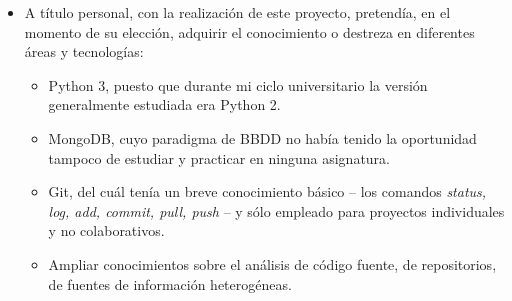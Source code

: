 \begin{itemize}
\item A título personal, con la realización de este proyecto, pretendía, en el momento de su elección, adquirir el conocimiento o destreza en diferentes áreas y tecnologías:

\begin{itemize}
\item Python 3, puesto que durante mi ciclo universitario la versión generalmente estudiada era Python 2.

\item MongoDB, cuyo paradigma de BBDD no había tenido la oportunidad tampoco de estudiar y practicar en ninguna asignatura.

\item Git, del cuál tenía un breve conocimiento básico – los comandos \textit{status, log, add, commit, pull, push} – y sólo empleado para proyectos individuales y no colaborativos.

\item Ampliar conocimientos sobre el análisis de código fuente, de repositorios, de fuentes de información heterogéneas.
\end{itemize}
\end{itemize}




